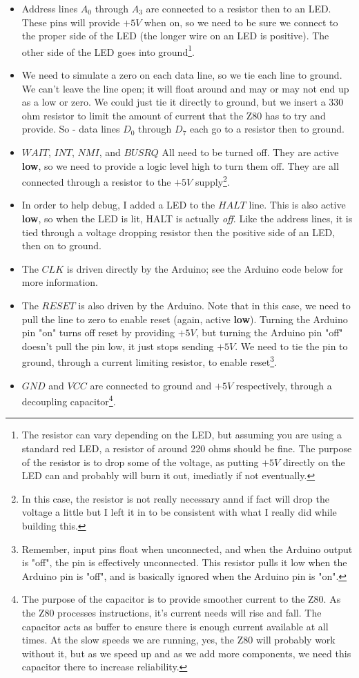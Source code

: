 \begin{itemize}
\item Address lines $A_{0}$ through $A_{3}$ are connected to a resistor then to an LED. These pins will provide $+5V$ when on, so we need to be sure we connect to the proper side of the LED (the longer wire on an LED is positive). The other side of the LED goes into ground\footnote{The resistor can vary depending on the LED, but assuming you are using a standard red LED, a resistor of around 220 ohms should be fine. The purpose of the resistor is to drop some of the voltage, as putting $+5V$ directly on the LED can and probably will burn it out, imediatly if not eventually.}.
\item We need to simulate a zero on each data line, so we tie each line to ground. We can't leave the line open; it will float around and may or may not end up as a low or zero. We could just tie it directly to ground, but we insert a 330 ohm resistor to limit the amount of current that the Z80 has to try and provide. So - data lines $D_{0}$ through $D_{7}$ each go to a resistor then to ground.
\item $WAIT$, $INT$, $NMI$, and $BUSRQ$ All need to be turned off. They are active \textbf{low}, so we need to provide a logic level high to turn them off. They are all connected through a resistor to the $+5V$ supply\footnote{In this case, the resistor is not really necessary annd if fact will drop the voltage a little but I left it in to be consistent with what I really did while building this.}.
\item In order to help debug, I added a LED to the $HALT$ line. This is also active \textbf{low}, so when the LED is lit, HALT is actually \textit{off}. Like the address lines, it is tied through a voltage dropping resistor then the positive side of an LED, then on to ground.
\item The $CLK$ is driven directly by the Arduino; see the Arduino code below for more information.
\item The $RESET$ is also driven by the Arduino. Note that in this case, we need to pull the line to zero to enable reset (again, active \textbf{low}). Turning the Arduino pin "on" turns off reset by providing $+5V$, but turning the Arduino pin "off" doesn't pull the pin low, it just stops sending $+5V$. We need to tie the pin to ground, through a current limiting resistor, to enable reset\footnote{Remember, input pins float when unconnected, and when the Arduino output is "off", the pin is effectively unconnected. This resistor pulls it low when the Arduino pin is "off", and is basically ignored when the Arduino pin is "on".}.
\item $GND$ and $VCC$ are connected to ground and $+5V$ respectively, through a decoupling capacitor\footnote{The purpose of the capacitor is to provide smoother current to the Z80. As the Z80 processes instructions, it's current needs will rise and fall. The capacitor acts as buffer to ensure there is enough current available at all times. At the slow speeds we are running, yes, the Z80 will probably work without it, but as we speed up and as we add more components, we need this capacitor there to increase reliability.}.
\end{itemize}

